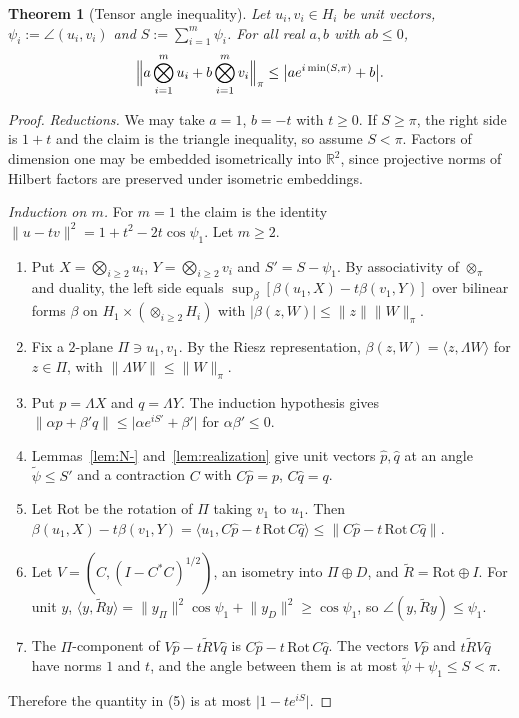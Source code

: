 \documentclass[11pt]{amsart}
\newtheorem{theorem}{Theorem}[section]
\theoremstyle{definition}
\newcommand{\R}{\mathbb{R}}
\newcommand{\norm}[1]{\lVert #1\rVert}
\newcommand{\abs}[1]{\lvert #1\rvert}
\newcommand{\ip}[2]{\langle #1,#2\rangle}
\begin{document}
\begin{theorem}[Tensor angle inequality]\label{thm:TA}
Let $u_i,v_i\in H_i$ be unit vectors, $\psi_i:=\angle(u_i,v_i)$ and
$S:=\sum_{i=1}^m\psi_i$. For all real $a,b$ with $ab\le0$,
\[
\Bigl\|a\bigotimes_{i=1}^mu_i+b\bigotimes_{i=1}^mv_i\Bigr\|_\pi\le\bigl|ae^{i\min(S,\pi)}+b\bigr|.
\]
\end{theorem}

\begin{proof}
\emph{Reductions.} We may take $a=1$, $b=-t$ with $t\ge0$. If $S\ge\pi$, the right side
is $1+t$ and the claim is the triangle inequality, so assume $S<\pi$. Factors of
dimension one may be embedded isometrically into $\R^2$, since projective norms of
Hilbert factors are preserved under isometric embeddings.

\emph{Induction on $m$.} For $m=1$ the claim is the identity
$\norm{u-tv}^2=1+t^2-2t\cos\psi_1$. Let $m\ge2$.
\begin{enumerate}[label=\textup{(\arabic*)}]
\item Put $X=\bigotimes_{i\ge2}u_i$, $Y=\bigotimes_{i\ge2}v_i$ and $S'=S-\psi_1$.
  By associativity of $\otimes_\pi$ and duality, the left side equals
  $\sup_\beta[\beta(u_1,X)-t\beta(v_1,Y)]$ over bilinear forms $\beta$ on
  $H_1\times(\otimes_{i\ge2}H_i)$ with $\abs{\beta(z,W)}\le\norm z\norm W_\pi$.
\item Fix a $2$-plane $\Pi\ni u_1,v_1$. By the Riesz representation,
  $\beta(z,W)=\ip z{\Lambda W}$ for $z\in\Pi$, with $\norm{\Lambda W}\le\norm W_\pi$.
\item Put $p=\Lambda X$ and $q=\Lambda Y$. The induction hypothesis gives
  $\norm{\alpha p+\beta'q}\le\abs{\alpha e^{iS'}+\beta'}$ for $\alpha\beta'\le0$.
\item Lemmas~\ref{lem:N-} and~\ref{lem:realization} give unit vectors $\hat p,\hat q$
  at an angle $\tilde\psi\le S'$ and a contraction $C$ with $C\hat p=p$, $C\hat q=q$.
\item Let $\mathrm{Rot}$ be the rotation of $\Pi$ taking $v_1$ to $u_1$. Then
  $\beta(u_1,X)-t\beta(v_1,Y)=\ip{u_1}{C\hat p-t\,\mathrm{Rot}\,C\hat q}\le\norm{C\hat p-t\,\mathrm{Rot}\,C\hat q}$.
\item Let $V=(C,(I-C^*C)^{1/2})$, an isometry into $\Pi\oplus D$, and
  $\tilde R=\mathrm{Rot}\oplus I$. For unit $y$,
  $\ip y{\tilde Ry}=\norm{y_\Pi}^2\cos\psi_1+\norm{y_D}^2\ge\cos\psi_1$, so
  $\angle(y,\tilde Ry)\le\psi_1$.
\item The $\Pi$-component of $V\hat p-t\tilde RV\hat q$ is
  $C\hat p-t\,\mathrm{Rot}\,C\hat q$. The vectors $V\hat p$ and $t\tilde RV\hat q$ have
  norms $1$ and $t$, and the angle between them is at most $\tilde\psi+\psi_1\le S<\pi$.
\end{enumerate}
Therefore the quantity in (5) is at most $\abs{1-te^{iS}}$.
\end{proof}
\end{document}
